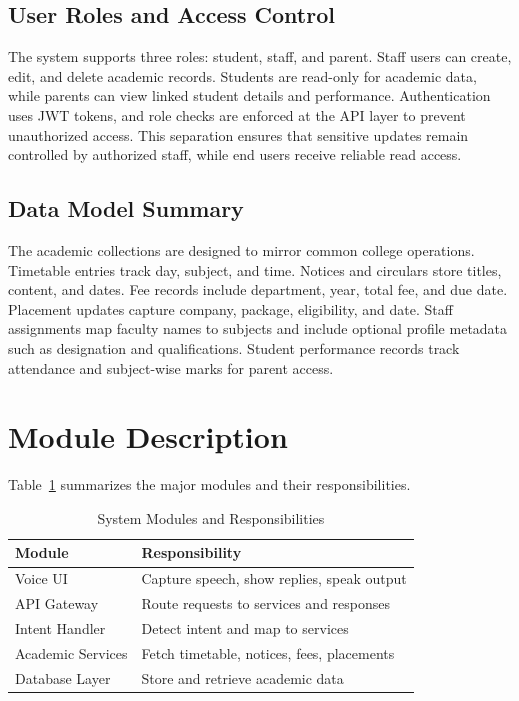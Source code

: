 ﻿\documentclass[conference]{IEEEtran}
\begin{document}
\subsection{User Roles and Access Control}
The system supports three roles: student, staff, and parent. Staff users can create, edit, and delete academic records. Students are read-only for academic data, while parents can view linked student details and performance. Authentication uses JWT tokens, and role checks are enforced at the API layer to prevent unauthorized access. This separation ensures that sensitive updates remain controlled by authorized staff, while end users receive reliable read access.

\subsection{Data Model Summary}
The academic collections are designed to mirror common college operations. Timetable entries track day, subject, and time. Notices and circulars store titles, content, and dates. Fee records include department, year, total fee, and due date. Placement updates capture company, package, eligibility, and date. Staff assignments map faculty names to subjects and include optional profile metadata such as designation and qualifications. Student performance records track attendance and subject-wise marks for parent access.

\section{Module Description}
Table~\ref{tab:modules} summarizes the major modules and their responsibilities.

\begin{table}[htbp]
\caption{System Modules and Responsibilities}
\label{tab:modules}
\centering
\begin{tabular}{@{}ll@{}}
\toprule
\textbf{Module} & \textbf{Responsibility} \\
\midrule
Voice UI & Capture speech, show replies, speak output \\
API Gateway & Route requests to services and responses \\
Intent Handler & Detect intent and map to services \\
Academic Services & Fetch timetable, notices, fees, placements \\
Database Layer & Store and retrieve academic data \\
\bottomrule
\end{tabular}
\end{table}
\end{document}

